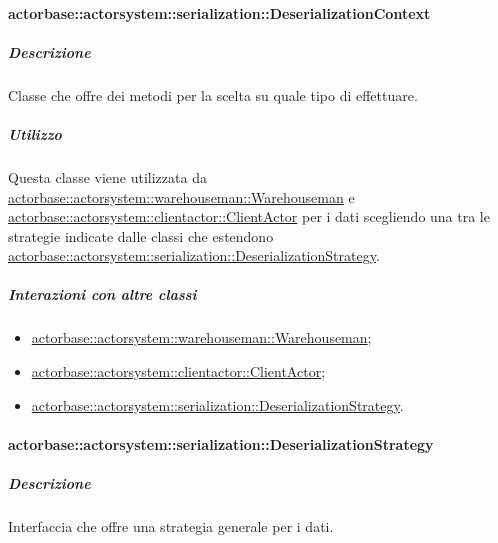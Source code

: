 \documentclass{scalatekids-article}
\begin{document}
\paragraph{actorbase::actorsystem::serialization::DeserializationContext}
\label{sec:actorbase::actorsystem::serialization::DeserializationContext}

\subparagraph{Descrizione}

Classe che offre dei metodi per la scelta su quale tipo di 
effettuare.

\subparagraph{Utilizzo}

Questa classe viene utilizzata da \hyperref[sec:actorbase::actorsystem::warehouseman::Warehouseman]{actorbase::actorsystem::warehouseman::Warehouseman}
e \hyperref[sec:actorbase::actorsystem::clientactor::ClientActor]{actorbase::\allowbreak{}actorsystem::\allowbreak{}clientactor::\allowbreak{}ClientActor}
per  i dati scegliendo una tra le strategie indicate
dalle classi che estendono \hyperref[sec:actorbase::actorsystem::serialization::DeserializationStrategy]{actorbase::\allowbreak{}actorsystem::\allowbreak{}serialization::\allowbreak{}DeserializationStrategy}.

\subparagraph{Interazioni con altre classi}

\begin{itemize}

\item \hyperref[sec:actorbase::actorsystem::warehouseman::Warehouseman]{actorbase::actorsystem::warehouseman::Warehouseman};
\item \hyperref[sec:actorbase::actorsystem::clientactor::ClientActor]{actorbase::actorsystem::clientactor::ClientActor};
\item \hyperref[sec:actorbase::actorsystem::serialization::DeserializationStrategy]{actorbase::actorsystem::serialization::DeserializationStrategy}.

\end{itemize}

\paragraph{actorbase::actorsystem::serialization::DeserializationStrategy}
\label{sec:actorbase::actorsystem::serialization::DeserializationStrategy}

\subparagraph{Descrizione}

Interfaccia che offre una strategia generale per  i dati.
\end{document}
